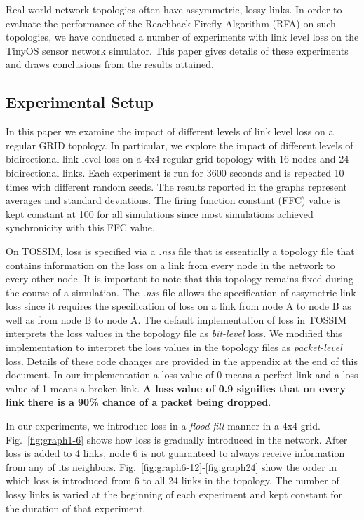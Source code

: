 
\noindent
Real world network topologies often have assymmetric, lossy links. In order to 
evaluate the performance of the Reachback Firefly Algorithm (RFA) on such topologies, we
have conducted a number of experiments with link level loss on the TinyOS sensor
network simulator. This paper gives details of these experiments and draws conclusions
from the results attained. \newline

\subsection{Experimental Setup}

\noindent
In this paper we examine the impact of different levels of link level loss on a regular GRID topology.
In particular, we explore the impact of different levels of bidirectional 
link level loss on a 4x4 regular grid topology with 16 nodes and 24 bidirectional links.  
Each experiment is run for 3600 seconds and is repeated 10 times with different random seeds.
The results reported in the graphs represent averages and standard deviations. 
The firing function constant (FFC) value is kept constant at 100 for all simulations
since most simulations achieved synchronicity with this FFC value.
\newline

\noindent
On TOSSIM, loss is specified via a \emph{.nss} file that is essentially a topology file that contains 
information on the loss on a link from every node in the network to every other node. 
It is important to note that this topology remains fixed during the course of a simulation.
The \emph{.nss} file allows the specification of assymetric link loss since it requires the specification of loss 
on a link from node A to node B as well as from node B to node A.
The default implementation of loss in TOSSIM interprets the loss values in the topology file as \emph{bit-level}
loss. We modified this implementation to interpret the loss values in the topology files as \emph{packet-level}
loss. Details of these code changes are provided in the appendix at the end of this document.
In our implementation a loss value of 0 means a perfect link and a loss value of 1 means a broken link. 
{\bf A loss value of 0.9 signifies that on every link there is a 90\% chance of a packet being dropped}. \newline

\noindent
In our experiments, we introduce loss in a {\it flood-fill} manner in a 4x4 grid. 
Fig.~\ref{fig:graph1-6} shows how loss is gradually introduced in the network. After
loss is added to 4 links, node 6 is not guaranteed to always receive information from
any of its neighbors. Fig.~\ref{fig:graph6-12}-\ref{fig:graph24} show the order
in which loss is introduced from 6 to all 24 links in the topology. 
The number of lossy links is varied at the beginning of each experiment and kept
constant for the duration of that experiment.
\newline

